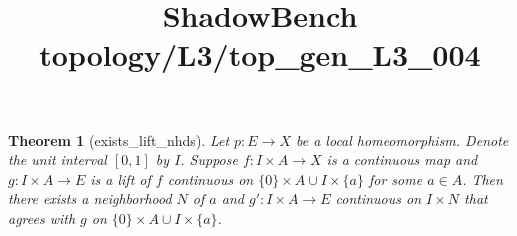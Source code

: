 \documentclass{article}
\title{ShadowBench topology/L3/top\_gen\_L3\_004}
\newtheorem{theorem}{Theorem}
\begin{document}
\maketitle

\begin{theorem}[exists_lift_nhds] Let \(p : E \to X\) be a local homeomorphism. Denote the unit interval \([0,1]\) by \(I\). Suppose \(f:I \times A \to X\) is a continuous map and \(g : I \times A \to E\) is a lift of \(f\) continuous on \(\{0\} \times A \cup I \times \{a\}\) for some $a \in A$. Then there exists a neighborhood \(N\) of \(a\) and \(g':I \times A \to E\) continuous on \(I \times N\) that agrees with \(g\) on \(\{0\} \times A \cup I \times \{a\} \).
\end{theorem}
\end{document}
